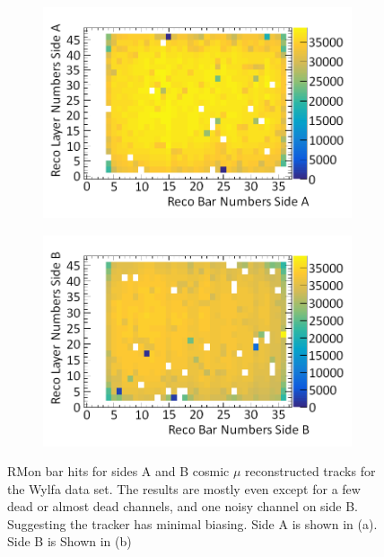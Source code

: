 \begin{figure}[!h]
\centering
\begin{subfigure}{.5\textwidth}
  \centering
  \includegraphics[width=\linewidth]{Chapter6/Figs/Raster/wylfaSideAHitsMedText.png}
  \captionsetup{width=.9\linewidth}
  \caption{}
  \label{subFig:wylfaSideAHits}
\end{subfigure}%
\begin{subfigure}{.5\textwidth}
  \centering
\includegraphics[width=\linewidth]{Chapter6/Figs/Raster/wylfaSideBHitsMedText.png}
  \captionsetup{width=.9\linewidth}
  \caption{}
  \label{subFig:wylfaSideBHits}
\end{subfigure}
\caption{RMon bar hits for sides A and B cosmic $\mu$ reconstructed tracks for the Wylfa data set. The results are mostly even except for a few dead or almost dead channels, and one noisy channel on side B. Suggesting the tracker has minimal biasing. Side A is shown in (a). Side B is Shown in (b)}
\label{fig:wylfaSideABHits}
\end{figure}


